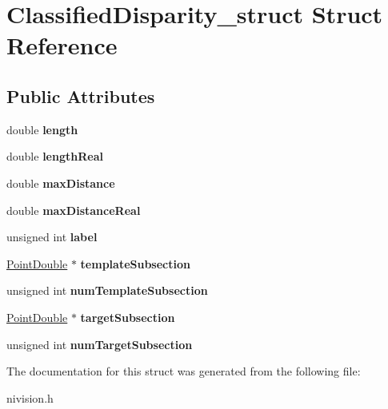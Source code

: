 \hypertarget{structClassifiedDisparity__struct}{
\section{ClassifiedDisparity\_\-struct Struct Reference}
\label{structClassifiedDisparity__struct}
}
\subsection*{Public Attributes}
\begin{DoxyCompactItemize}
\item 
\hypertarget{structClassifiedDisparity__struct_a39382b1b56ea93fded0bc04e2f9a49be}{
double {\bfseries length}}
\label{structClassifiedDisparity__struct_a39382b1b56ea93fded0bc04e2f9a49be}

\item 
\hypertarget{structClassifiedDisparity__struct_a97a4d3763c2c9cc41d3360a69ada3859}{
double {\bfseries lengthReal}}
\label{structClassifiedDisparity__struct_a97a4d3763c2c9cc41d3360a69ada3859}

\item 
\hypertarget{structClassifiedDisparity__struct_a7d256cd7d0712495503298251395cf6b}{
double {\bfseries maxDistance}}
\label{structClassifiedDisparity__struct_a7d256cd7d0712495503298251395cf6b}

\item 
\hypertarget{structClassifiedDisparity__struct_ae5401bc06d7dca87b1f05672b88eb529}{
double {\bfseries maxDistanceReal}}
\label{structClassifiedDisparity__struct_ae5401bc06d7dca87b1f05672b88eb529}

\item 
\hypertarget{structClassifiedDisparity__struct_a1970eecef5576466b51e75b43cc8bfea}{
unsigned int {\bfseries label}}
\label{structClassifiedDisparity__struct_a1970eecef5576466b51e75b43cc8bfea}

\item 
\hypertarget{structClassifiedDisparity__struct_a282186f6c48a862849b351048375826e}{
\hyperlink{structPointDouble__struct}{PointDouble} $\ast$ {\bfseries templateSubsection}}
\label{structClassifiedDisparity__struct_a282186f6c48a862849b351048375826e}

\item 
\hypertarget{structClassifiedDisparity__struct_aefaa2821decf1b40c925af19cc8012c8}{
unsigned int {\bfseries numTemplateSubsection}}
\label{structClassifiedDisparity__struct_aefaa2821decf1b40c925af19cc8012c8}

\item 
\hypertarget{structClassifiedDisparity__struct_a50a5b9ff25cab80df2b23bd0df326a27}{
\hyperlink{structPointDouble__struct}{PointDouble} $\ast$ {\bfseries targetSubsection}}
\label{structClassifiedDisparity__struct_a50a5b9ff25cab80df2b23bd0df326a27}

\item 
\hypertarget{structClassifiedDisparity__struct_ae9caa20c579379defa5a9845c516f99b}{
unsigned int {\bfseries numTargetSubsection}}
\label{structClassifiedDisparity__struct_ae9caa20c579379defa5a9845c516f99b}

\end{DoxyCompactItemize}


The documentation for this struct was generated from the following file:\begin{DoxyCompactItemize}
\item 
nivision.h\end{DoxyCompactItemize}

